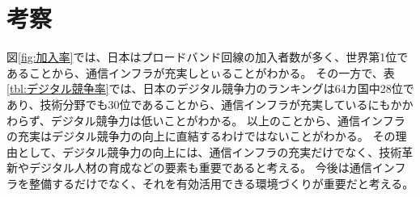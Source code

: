 \documentclass[a4paper,11pt,dvipdfmx]{ujarticle}
\begin{document}
\section{考察}

図\ref{fig:加入率}では、日本はプロードバンド回線の加入者数が多く、世界第1位であることから、通信インフラが充実しとぃることがわかる。
その一方で、表\ref{tbl:デジタル競争率}では、日本のデジタル競争力のランキングは64カ国中28位であり、技術分野でも30位であることから、通信インフラが充実しているにもかかわらず、デジタル競争力は低いことがわかる。
以上のことから、通信インフラの充実はデジタル競争力の向上に直結するわけではないことがわかる。
その理由として、デジタル競争力の向上には、通信インフラの充実だけでなく、技術革新やデジタル人材の育成などの要素も重要であると考える。
今後は通信インフラを整備するだけでなく、それを有効活用できる環境づくりが重要だと考える。








%

%



\end{document}
